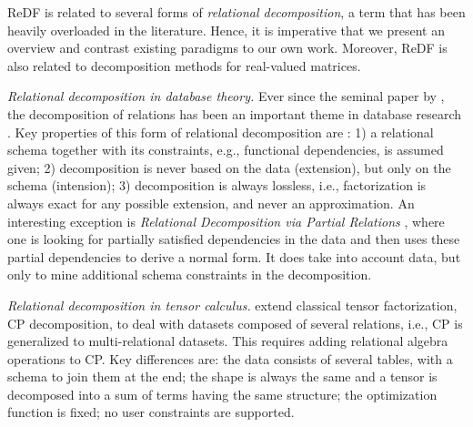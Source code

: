 ReDF is related to several forms of \emph{relational decomposition}, a term that has been heavily overloaded in the literature. Hence, it is imperative that we present an overview and contrast existing paradigms to our own work. Moreover, ReDF is also related to decomposition methods for real-valued matrices.

\textit{Relational decomposition in database theory.} Ever since the seminal paper by \cite{codd}, the decomposition of relations has been an important theme in database research \parencite{normal_form_relational_decomposition, date_book}. Key properties of this form of relational decomposition are \parencite{elmasri_book}: 1) a relational schema together with its constraints, e.g., functional dependencies, is assumed given; 2) decomposition is never based on the data (extension), but only on the schema (intension); 3) decomposition is always lossless, i.e., factorization is always exact for any possible extension, and never an approximation. An interesting exception is \textit{Relational Decomposition via Partial Relations} \parencite{partial_dependencies}, where one is looking for partially satisfied dependencies in the data and then uses these partial dependencies to derive a normal form. It does take into account data, but only to mine additional schema constraints in the decomposition.



\textit{Relational decomposition in tensor calculus.} \cite{tensor_decompositon} extend classical tensor factorization, CP decomposition, to deal with datasets composed of several relations, i.e., CP is generalized to multi-relational datasets. This requires adding relational algebra operations to CP. Key differences are: the data consists of several tables, with a schema to join them at the end; the shape is always the same and a tensor is decomposed into a sum of terms having the same structure; the optimization function is fixed; no user constraints are supported.

